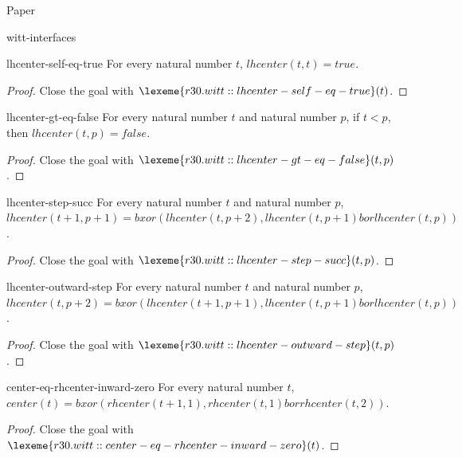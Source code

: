 \begin{lexlean}{Paper}
\begin{section}{witt-interfaces}
  \begin{theorem}{lhcenter-self-eq-true}
  For every natural number \(t\), \(lhcenter(t, t) = true\).
  \begin{proof}
  Close the goal with \(\lexeme{r30.witt::lhcenter-self-eq-true}(t)\).
  \end{proof}
  \end{theorem}

  \begin{theorem}{lhcenter-gt-eq-false}
  For every natural number \(t\) and natural number \(p\), if \(t < p\), then \(lhcenter(t, p) = false\).
  \begin{proof}
  Close the goal with \(\lexeme{r30.witt::lhcenter-gt-eq-false}(t, p)\).
  \end{proof}
  \end{theorem}

  \begin{theorem}{lhcenter-step-succ}
  For every natural number \(t\) and natural number \(p\), \(lhcenter(t + 1, p + 1) = bxor(lhcenter(t, p + 2), lhcenter(t, p + 1) bor lhcenter(t, p))\).
  \begin{proof}
  Close the goal with \(\lexeme{r30.witt::lhcenter-step-succ}(t, p)\).
  \end{proof}
  \end{theorem}

  \begin{theorem}{lhcenter-outward-step}
  For every natural number \(t\) and natural number \(p\), \(lhcenter(t, p + 2) = bxor(lhcenter(t + 1, p + 1), lhcenter(t, p + 1) bor lhcenter(t, p))\).
  \begin{proof}
  Close the goal with \(\lexeme{r30.witt::lhcenter-outward-step}(t, p)\).
  \end{proof}
  \end{theorem}

  \begin{theorem}{center-eq-rhcenter-inward-zero}
  For every natural number \(t\), \(center(t) = bxor(rhcenter(t + 1, 1), rhcenter(t, 1) bor rhcenter(t, 2))\).
  \begin{proof}
  Close the goal with \(\lexeme{r30.witt::center-eq-rhcenter-inward-zero}(t)\).
  \end{proof}
  \end{theorem}


\end{section}
\end{lexlean}
